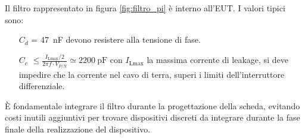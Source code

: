 Il filtro rappresentato in figura \ref{fig:filtro_pi} è interno all'EUT.
I valori tipici sono:
\begin{itemize}
 \item [$C_d$] = \SI{47}{\nano\farad} devono resistere alla tensione di fase.
 \item [$C_c$] $\leq \frac{I_{\text{Lmax}}/2}{2\pi f \cdot V_{P/N}} \simeq 
 \SI{2200}{\pico\farad}$  con $I_{\text{Lmax}}$ la massima corrente di 
 leakage, si deve impedire che la corrente 
 nel cavo di terra, superi i limiti dell'interruttore differenziale.
\end{itemize}

È fondamentale integrare il filtro durante la progettazione della scheda, evitando
costi inutili aggiuntivi per trovare dispositivi discreti da integrare durante la fase
finale della realizzazione del dispositivo.
